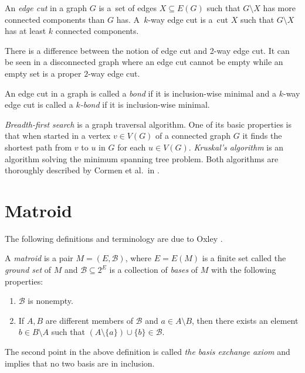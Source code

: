 An \textit{edge cut} in a graph $G$ is a~set of edges $X \subseteq E(G)$ such that $G \setminus X$ has more connected components than $G$ has. A~$k$-way edge cut is a~cut $X$ such that $G \setminus X$ has at least $k$ connected components.

\pagebreak

\begin{note}
	There is a difference between the notion of edge cut and 2-way edge cut. It can be seen in a disconnected graph where an edge cut cannot be empty while an empty set is a proper $2$-way edge cut.
\end{note}

An edge cut in a graph is called a \textit{bond} if it is inclusion-wise minimal and a $k$-way edge cut is called a \textit{$k$-bond} if it is inclusion-wise minimal.

\textit{Breadth-first search} is a graph traversal algorithm. One of its basic properties is that when started in a vertex $v \in V(G)$ of a connected graph $G$ it finds the shortest path from $v$ to $u$ in $G$ for each $u \in V(G)$. \textit{Kruskal's algorithm} is an algorithm solving the minimum spanning tree problem. Both algorithms are thoroughly described by Cormen et al.\ in \cite{clrs}.

\section{Matroid}
The following definitions and terminology are due to Oxley \cite{oxley2006matroid}.

\begin{defn}[Matroid]
	A \textit{matroid} is a pair $M = (E,\mathcal{B})$, where $E = E(M)$ is a finite set called the \textit{ground set} of $M$ and $\mathcal{B} \subseteq 2^{E}$ is a collection of \textit{bases} of $M$ with the following properties:
	\begin{enumerate}
		\item $\mathcal{B}$ is nonempty.
		\item If $A, B$ are different members of $\mathcal{B}$ and $a \in A \setminus B$, then there exists an element $b \in B \setminus A$ such that $(A \setminus \{a\}) \cup \{b\} \in \mathcal{B}$.
	\end{enumerate}
\end{defn}

\begin{rem}
The second point in the above definition is called \textit{the basis exchange axiom} and implies that no two basis are in inclusion.
\end{rem}

